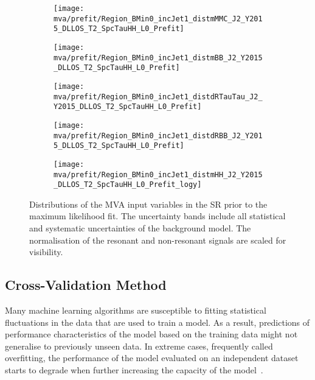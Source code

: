 \begin{figure}[htbp]
  \centering

  \begin{subfigure}[t]{.46\textwidth}
    \texttt{[image: mva/prefit/Region\_BMin0\_incJet1\_distmMMC\_J2\_Y2015\_DLLOS\_T2\_SpcTauHH\_L0\_Prefit]}
  \end{subfigure}\hfill %
  \begin{subfigure}[t]{.46\textwidth}
    \texttt{[image: mva/prefit/Region\_BMin0\_incJet1\_distmBB\_J2\_Y2015\_DLLOS\_T2\_SpcTauHH\_L0\_Prefit]}
  \end{subfigure}

  \begin{subfigure}[t]{.46\textwidth}
    \texttt{[image: mva/prefit/Region\_BMin0\_incJet1\_distdRTauTau\_J2\_Y2015\_DLLOS\_T2\_SpcTauHH\_L0\_Prefit]}
  \end{subfigure}\hfill %
  \begin{subfigure}[t]{.46\textwidth}
    \texttt{[image: mva/prefit/Region\_BMin0\_incJet1\_distdRBB\_J2\_Y2015\_DLLOS\_T2\_SpcTauHH\_L0\_Prefit]}
  \end{subfigure}

  \begin{subfigure}[t]{.46\textwidth}
    \texttt{[image: mva/prefit/Region\_BMin0\_incJet1\_distmHH\_J2\_Y2015\_DLLOS\_T2\_SpcTauHH\_L0\_Prefit\_logy]}
  \end{subfigure}

  \caption[Distributions of the MVA input variables in the \hadhad
  SR.]{Distributions of the MVA input variables in the \hadhad SR prior to the
    maximum likelihood fit. The uncertainty bands include all statistical and
    systematic uncertainties of the background model. The normalisation of the
    resonant and non-resonant \HH signals are scaled for visibility.}%
  \label{fig:mva_inputs}
\end{figure}


\subsection{Cross-Validation Method}
\label{sec:mva_crossvalidation}

Many machine learning algorithms
are susceptible to fitting statistical fluctuations in the data that
are used to train a model. As a result, predictions of performance
characteristics of the model based on the training data might not
generalise to previously unseen data. In extreme cases, frequently
called overfitting, the performance of the model evaluated on an
independent dataset starts to degrade when further increasing the
capacity of the model~\cite{hastie09}.

